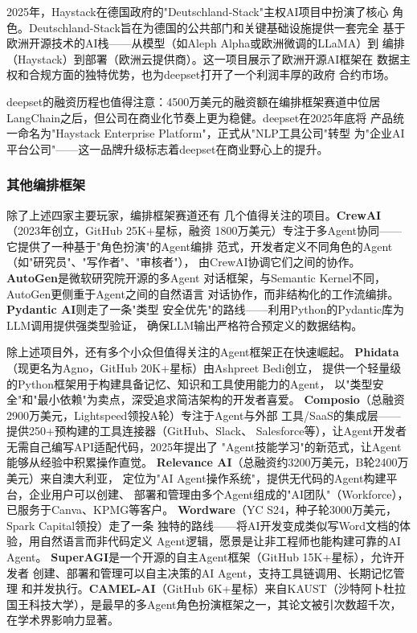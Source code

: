 2025年，Haystack在德国政府的"Deutschland-Stack"主权AI项目中扮演了核心
角色。Deutschland-Stack旨在为德国的公共部门和关键基础设施提供一套完全
基于欧洲开源技术的AI栈——从模型（如Aleph Alpha或欧洲微调的LLaMA）到
编排（Haystack）到部署（欧洲云提供商）。这一项目展示了欧洲开源AI框架在
数据主权和合规方面的独特优势，也为deepset打开了一个利润丰厚的政府
合约市场。

deepset的融资历程也值得注意：4500万美元的融资额在编排框架赛道中位居
LangChain之后，但公司在商业化节奏上更为稳健。deepset在2025年底将
产品统一命名为"Haystack Enterprise Platform"，正式从"NLP工具公司"转型
为"企业AI平台公司"——这一品牌升级标志着deepset在商业野心上的提升。

\subsubsection{其他编排框架} 除了上述四家主要玩家，编排框架赛道还有
几个值得关注的项目。\textbf{CrewAI}（2023年创立，GitHub 25K+星标，融资
1800万美元）专注于多Agent协同——它提供了一种基于"角色扮演"的Agent编排
范式，开发者定义不同角色的Agent（如"研究员"、"写作者"、"审核者"），
由CrewAI协调它们之间的协作。\textbf{AutoGen}是微软研究院开源的多Agent
对话框架，与Semantic Kernel不同，AutoGen更侧重于Agent之间的自然语言
对话协作，而非结构化的工作流编排。\textbf{Pydantic AI}则走了一条"类型
安全优先"的路线——利用Python的Pydantic库为LLM调用提供强类型验证，
确保LLM输出严格符合预定义的数据结构。

除上述项目外，还有多个小众但值得关注的Agent框架正在快速崛起。
\textbf{Phidata}（现更名为Agno，GitHub 20K+星标）由Ashpreet Bedi创立，
提供一个轻量级的Python框架用于构建具备记忆、知识和工具使用能力的Agent，
以"类型安全"和"最小依赖"为卖点，深受追求简洁架构的开发者喜爱。
\textbf{Composio}（总融资2900万美元，Lightspeed领投A轮）专注于Agent与外部
工具/SaaS的集成层——提供250+预构建的工具连接器（GitHub、Slack、
Salesforce等），让Agent开发者无需自己编写API适配代码，2025年提出了
"Agent技能学习"的新范式，让Agent能够从经验中积累操作直觉。
\textbf{Relevance AI}（总融资约3200万美元，B轮2400万美元）来自澳大利亚，
定位为"AI Agent操作系统"，提供无代码的Agent构建平台，企业用户可以创建、
部署和管理由多个Agent组成的"AI团队"（Workforce），已服务于Canva、KPMG等客户。
\textbf{Wordware}（YC S24，种子轮3000万美元，Spark Capital领投）走了一条
独特的路线——将AI开发变成类似写Word文档的体验，用自然语言而非代码定义
Agent逻辑，愿景是让非工程师也能构建可靠的AI Agent。
\textbf{SuperAGI}是一个开源的自主Agent框架（GitHub 15K+星标），允许开发者
创建、部署和管理可以自主决策的AI Agent，支持工具链调用、长期记忆管理
和并发执行。\textbf{CAMEL-AI}（GitHub 6K+星标）来自KAUST（沙特阿卜杜拉
国王科技大学），是最早的多Agent角色扮演框架之一，其论文被引次数超千次，
在学术界影响力显著。

